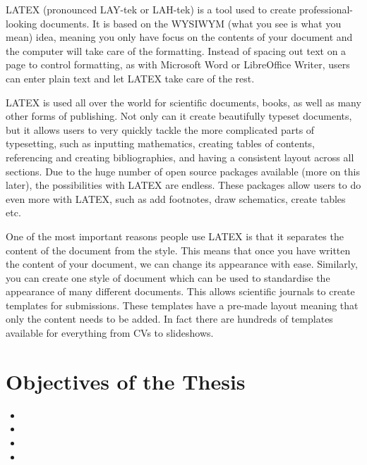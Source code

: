 \documentclass[12pt, twoside,openright]{report}
\begin{document}
\begin{spacing}{1.5}
LATEX (pronounced LAY-tek or LAH-tek) is a tool used to create professional-looking documents. It is based on the WYSIWYM (what you see is what you mean) idea, meaning you only have focus on the contents of your document and the computer will take care of the formatting. Instead of spacing out text on a page to control formatting, as with Microsoft Word or LibreOffice Writer, users can enter plain text and let LATEX take care of the rest.

LATEX is used all over the world for scientific documents, books, as well as many other forms of publishing. Not only can it create beautifully typeset documents, but it allows users to very quickly tackle the more complicated parts of typesetting, such as inputting mathematics, creating tables of contents, referencing and creating bibliographies, and having a consistent layout across all sections. Due to the huge number of open source packages available (more on this later), the possibilities with LATEX are endless. These packages allow users to do even more with LATEX, such as add footnotes, draw schematics, create tables etc.

One of the most important reasons people use LATEX is that it separates the content of the document from the style. This means that once you have written the content of your document, we can change its appearance with ease. Similarly, you can create one style of document which can be used to standardise the appearance of many different documents. This allows scientific journals to create templates for submissions. These templates have a pre-made layout meaning that only the content needs to be added. In fact there are hundreds of templates available for everything from CVs to slideshows.


\section{Objectives of the Thesis}
\lipsum[1-2] 


\begin{itemize}

\item 
\lipsum[1]

\item
\lipsum[2]

\item 
\lipsum[3]

\item
\lipsum[4]


\end{itemize}
\end{spacing}
\end{document}
